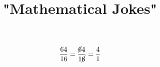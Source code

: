 \documentclass{article}
\title {"Mathematical Jokes"}
\begin{document}
\begin{equation}
\frac{64}{16}
=
\frac{\cancel{6}4}{1\cancel{6}}
=
\frac{4}{1}
\end{equation}
\end{document}
